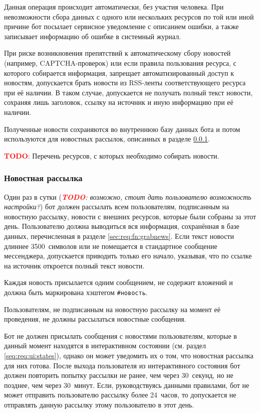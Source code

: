\documentclass[12pt]{article}
\newcommand{\todo}[1]{\textcolor{red}{\textbf{TODO}}: #1}
\newcommand{\inlinetodo}[1]{(\emph{\textcolor{red}{\textbf{TODO}}: #1})}
\begin{document}
            Данная операция происходит автоматически, без участия человека. При невозможности сбора данных
            с одного или нескольких ресурсов по той или иной причине бот посылает сервисное уведомление
            с описанием ошибки, а также записывает информацию об ошибке в системный журнал.

            При риске возникновения препятствий к автоматическому сбору новостей (например, CAPTCHA-проверок)
            или если правила пользования ресурса, с которого собирается информация, запрещает автоматизированный
            доступ к новостям, допускается брать новости из RSS-ленты соответствующего ресурса при её наличии.
            В таком случае, допускается не получать полный текст новости, сохраняя лишь заголовок,
            ссылку на источник и иную информацию при её наличии.

            Полученные новости сохраняются во внутреннюю базу данных бота и потом используются для новостных
            рассылок, описанных в разделе \ref{sec:req:fn:newsletter}.

            \todo{Перечень ресурсов, с которых необходимо собирать новости.}

        \subsubsection{Новостная рассылка}
            \label{sec:req:fn:newsletter}
            Один раз в сутки \inlinetodo{возможно, стоит дать пользователю возможность настройки?} бот
            должен рассылать всем пользователям, подписанным на новостную рассылку, новости с внешних
            ресурсов, которые были собраны за этот день. Пользователю
            должна выводиться вся информация, сохранённая в базе данных, перечисленная в разделе
            \ref{sec:req:fn:grabnews}. Если текст новости длиннее 3500~символов или не помещается в
            стандартное сообщение мессенджера, допускается приводить только его начало, указывая,
            что по ссылке на источник откроется полный текст новости.

            Каждая новость присылается одним сообщением, не содержит вложений и
            должна быть маркирована хэштегом \hbox{\texttt{\#новость}}.

            Пользователям, не подписанным на новостную рассылку на момент её проведения, не должны
            рассылаться новостные сообщения.

            Бот не должен присылать сообщения с новостями пользователям, которые в данный момент находятся
            в интерактивном состоянии (см. раздел \ref{seq:req:ui:states}),
            однако он может уведомить их о том, что новостная рассылка для них готова.
            После выхода пользователя из интерактивного состояния бот должен повторить попытку
            рассылки не ранее, чем через 30~секунд, но не позднее, чем через 30~минут.
            Если, руководствуясь данными правилами, бот не может отправить пользователю рассылку
            более 24~часов, то допускается не отправлять данную рассылку этому пользователю в этот день.
\end{document}
